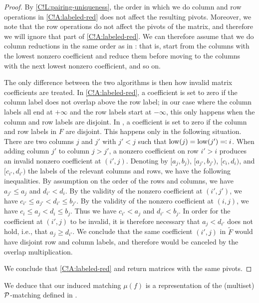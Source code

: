 \begin{proof}
  By \cref{C!L:pairing-uniqueness}, the order in which we do column and row operations in \cref{C!A:labeled-red} does not affect the resulting pivots. Moreover, we note that the row operations do not affect the pivots of the matrix, and therefore we will ignore that part of \cref{C!A:labeled-red}. We can therefore assume that we do column reductions in the same order as in \cite[Algorithm 1]{GST2025}: that is, start from the columns with the lowest nonzero coefficient and reduce them before moving to the columns with the next lowest nonzero coefficient, and so on.

  The only difference between the two algorithms is then how invalid matrix coefficients are treated. In \cref{C!A:labeled-red}, a coefficient is set to zero if the column label does not overlap above the row label; in our case where the column labels all end at $+\infty$ and the row labels start at $-\infty$, this only happens when the column and row labels are disjoint. In \cite[Algorithm 1]{GST2025}, a coefficient is set to zero if the column and row labels in $F$ are disjoint. This happens only in the following situation. There are two columns $j$ and $j'$ with $j' < j$ such that $\operatorname{low}(j) = \operatorname{low}(j') \eqcolon i$. When adding column $j'$ to column $j > j'$, a nonzero coefficient on row $i' > i$ produces an invalid nonzero coefficient at $(i', j)$. Denoting by $[a_j, b_j)$, $[a_{j'}, b_{j'})$, $[c_i, d_i)$, and $[c_{i'}, d_{i'})$ the labels of the relevant columns and rows, we have the following inequalities. By assumption on the order of the rows and columns, we have $a_{j'} \leq a_j$ and $d_{i'} < d_i$. By the validity of the nonzero coefficient at $(i', j')$, we have $c_{i'} \leq a_{j'} < d_{i'} \leq b_{j'}$. By the validity of the nonzero coefficient at $(i, j)$, we have $c_i \leq a_j < d_i \leq b_j$. Thus we have $c_{i'} < a_j$ and $d_{i'} < b_j$. In order for the coefficient at $(i', j)$ to be invalid, it is therefore necessary that $a_j < d_{i'}$ does not hold, i.e., that $a_j \geq d_{i'}$. We conclude that the same coefficient $(i', j)$ in $\tilde{F}$ would have disjoint row and column labels, and therefore would be canceled by the overlap multiplication.

  We conclude that \cref{C!A:labeled-red} and \cite[Algorithm 1]{GST2025} return matrices with the same pivots.
\end{proof}

We deduce that our induced matching $\mu(f)$ is a representation of the (multiset) $\mathcal{P}$-matching defined in \cite{GST2025}.

